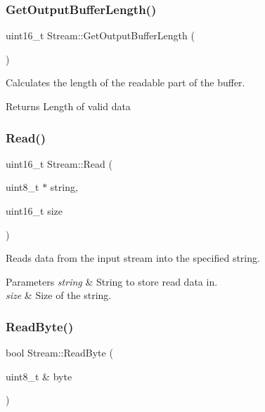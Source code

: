 \subsubsection{\texorpdfstring{Get\+Output\+Buffer\+Length()}{GetOutputBufferLength()}}
{\footnotesize\ttfamily uint16\+\_\+t Stream\+::\+Get\+Output\+Buffer\+Length (\begin{DoxyParamCaption}{ }\end{DoxyParamCaption})\hspace{0.3cm}{\ttfamily [virtual]}}

Calculates the length of the readable part of the buffer. \begin{DoxyReturn}{Returns}
Length of valid data 
\end{DoxyReturn}
\hypertarget{class_stream_a851572e5787cd98383d5118de378724b}{}\label{class_stream_a851572e5787cd98383d5118de378724b} 
\subsubsection{\texorpdfstring{Read()}{Read()}}
{\footnotesize\ttfamily uint16\+\_\+t Stream\+::\+Read (\begin{DoxyParamCaption}\item[{uint8\+\_\+t $\ast$}]{string,  }\item[{uint16\+\_\+t}]{size }\end{DoxyParamCaption})\hspace{0.3cm}{\ttfamily [virtual]}}

Reads data from the input stream into the specified string. 
\begin{DoxyParams}{Parameters}
{\em string} & String to store read data in. \\
\hline
{\em size} & Size of the string. \\
\hline
\end{DoxyParams}
\hypertarget{class_stream_a6db4180f5834073f992608b856bddca2}{}\label{class_stream_a6db4180f5834073f992608b856bddca2} 
\subsubsection{\texorpdfstring{Read\+Byte()}{ReadByte()}}
{\footnotesize\ttfamily bool Stream\+::\+Read\+Byte (\begin{DoxyParamCaption}\item[{uint8\+\_\+t \&}]{byte }\end{DoxyParamCaption})\hspace{0.3cm}{\ttfamily [virtual]}}

